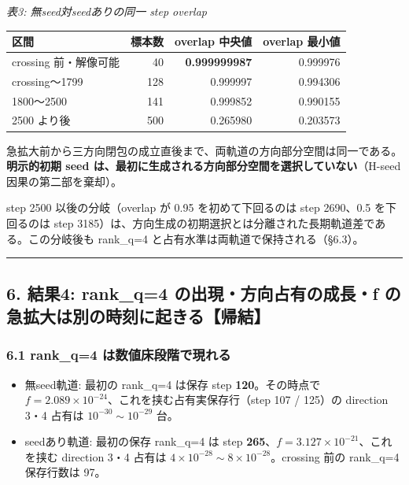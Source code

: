 \documentclass[
  a4paper,
]{ltjsarticle}
\newcounter{none} %
\providecommand{\tightlist}{%
  \setlength{\itemsep}{0pt}\setlength{\parskip}{0pt}}
\begin{document}
\emph{表3: 無seed対seedありの同一 step overlap}

{\def\LTcaptype{none} %
\begin{longtable}[]{@{}lrrr@{}}
\toprule\noalign{}
区間 & 標本数 & overlap 中央値 & overlap 最小値 \\
\midrule\noalign{}
\endhead
\bottomrule\noalign{}
\endlastfoot
crossing 前・解像可能 & 40 & \textbf{0.999999987} & 0.999976 \\
crossing〜1799 & 128 & 0.999997 & 0.994306 \\
1800〜2500 & 141 & 0.999852 & 0.990155 \\
2500 より後 & 500 & 0.265980 & 0.203573 \\
\end{longtable}
}

急拡大前から三方向閉包の成立直後まで、両軌道の方向部分空間は同一である。\textbf{明示的初期
seed
は、最初に生成される方向部分空間を選択していない}（H-seed因果の第二部を棄却）。

step 2500 以後の分岐（overlap が 0.95 を初めて下回るのは step 2690、0.5
を下回るのは step
3185）は、方向生成の初期選択とは分離された長期軌道差である。この分岐後も
rank\_q=4 と占有水準は両軌道で保持される（§6.3）。

\begin{center}\rule{0.5\linewidth}{0.5pt}\end{center}

\subsection{6. 結果4: rank\_q=4 の出現・方向占有の成長・f
の急拡大は別の時刻に起きる【帰結】}\label{ux7d50ux679c4-rank_q4-ux306eux51faux73feux65b9ux5411ux5360ux6709ux306eux6210ux9577f-ux306eux6025ux62e1ux5927ux306fux5225ux306eux6642ux523bux306bux8d77ux304dux308bux5e30ux7d50}

\subsubsection{6.1 rank\_q=4
は数値床段階で現れる}\label{rank_q4-ux306fux6570ux5024ux5e8aux6bb5ux968eux3067ux73feux308cux308b}

\begin{itemize}
\tightlist
\item
  無seed軌道: 最初の rank\_q=4 は保存 step \textbf{120}。その時点で
  \(f=2.089\times10^{-24}\)、これを挟む占有実保存行（step 107 / 125）の
  direction 3・4 占有は \(10^{-30}\sim10^{-29}\) 台。
\item
  seedあり軌道: 最初の保存 rank\_q=4 は step
  \textbf{265}、\(f=3.127\times10^{-21}\)、これを挟む direction 3・4
  占有は \(4\times10^{-28}\sim8\times10^{-28}\)。crossing 前の rank\_q=4
  保存行数は 97。
\end{itemize}
\end{document}
